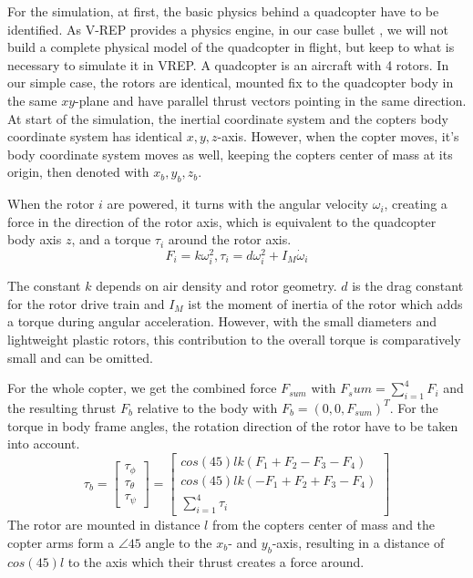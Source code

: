 For the simulation, at first, the basic physics behind a quadcopter have to be identified. As V-REP provides a physics engine, in our case bullet \cite{bullet}, we will not build a complete physical model of the quadcopter in flight, but keep to what is necessary to simulate it in VREP.
A quadcopter is an aircraft with 4 rotors. In our simple case, the rotors are identical, mounted fix to the quadcopter body in the same $xy$-plane and have parallel thrust vectors pointing in the same direction. At start of the simulation, the inertial coordinate system and the copters body coordinate system has identical $x,y,z$-axis. However, when the copter moves, it's body coordinate system moves as well, keeping the copters center of mass at its origin, then denoted with $x_b, y_b, z_b$.

When the rotor $i$ are powered, it turns with the angular velocity $\omega_i$, creating a force in the direction of the rotor axis, which is equivalent to the quadcopter body axis $z$, and a torque $\tau_i$ around the rotor axis.
\begin{equation}
F_i = k\omega_i^2, \tau_i = d\omega_i^2 + I_M\dot\omega_i
\end{equation}

The constant $k$ depends on air density and rotor geometry. $d$ is the drag constant for the rotor drive train and $I_M$ ist the moment of inertia of the rotor which adds a torque during angular acceleration. However, with the small diameters and lightweight plastic rotors, this contribution to the overall torque is comparatively small and can be omitted.

For the whole copter, we get the combined force $F_{sum}$ with $F_sum = \sum_{i=1}^{4}{F_i}$ and the resulting thrust $F_b$ relative to the body with $F_b = (0, 0, F_{sum})^T$. For the torque in body frame angles, the rotation direction of the rotor have to be taken into account.
\begin{equation}
\tau_b =\begin{bmatrix}\tau_\phi \\ \tau_\theta \\ \tau_\psi \end{bmatrix} = \begin{bmatrix}cos(45)lk(F_1 + F_2 - F_3 - F_4) \\ cos(45)lk(-F_1 + F_2 + F_3  - F_4  ) \\ \sum_{i=1}^{4}{\tau_i} \end{bmatrix}
\end{equation}
The rotor are mounted in distance $l$ from the copters center of mass and the copter arms form a $\angle{45}$ angle to the $x_b$- and $y_b$-axis, resulting in a distance of $cos(45)l$ to the axis which their thrust creates a force around. 



